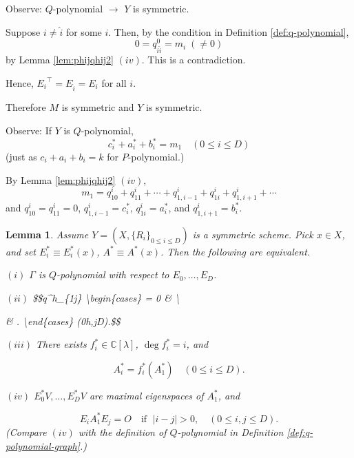 \documentclass[
]{book}
\newtheorem{lemma}{Lemma}[chapter]
\theoremstyle{definition}
\theoremstyle{definition}
\theoremstyle{definition}
\theoremstyle{definition}
\theoremstyle{remark}
\begin{document}
Observe: \(Q\)-polynomial \(\to\) \(Y\) is symmetric.

Suppose \(i\neq \hat{i}\) for some \(i\). Then, by the condition in Definition \ref{def:q-polynomial},
\[0 = q^0_{i\hat{i}} = m_i \; (\neq 0)\]
by Lemma \ref{lem:phijqhij2} \((iv)\).
This is a contradiction.

Hence, \({E_i}^\top = E_{\hat{i}} = E_i\) for all \(i\).

Therefore \(M\) is symmetric and \(Y\) is symmetric.

Observe: If \(Y\) is \(Q\)-polynomial,
\[c^*_i + a^*_i + b^*_i = m_1 \quad (0\leq i\leq D)\]
(just as \(c_i + a_i + b_i = k\) for \(P\)-polynomial.)

By Lemma \ref{lem:phijqhij2} \((iv)\),
\[m_1 = q^i_{10} + q^i_{11} + \cdots + q^i_{1,i-1} + q^i_{1i} + q^i_{1,i+1} + \cdots \]
and \(q^i_{10} = q^i_{11} = 0\), \(q^i_{1,i-1} = c^*_i\), \(q^i_{1i} = a^*_i\), and \(q^i_{1,i+1} = b^*_i\).

\begin{lemma}
\protect\hypertarget{lem:q-conditions}{}\label{lem:q-conditions}Assume \(Y = (X, \{R_i\}_{0\leq i\leq D})\) is a symmetric scheme. Pick \(x\in X\), and set \(E^*_i\equiv E^*_i(x)\), \(A^*\equiv A^*(x)\). Then the following are equivalent.

\((i)\) \(\Gamma\) is \(Q\)-polynomial with respect to \(E_0, \ldots, E_D\).

\((ii)\) \$\$q\^{}h\_\{1j\} \textbackslash begin\{cases\} = 0 \&  \textbackslash{}

 \& . \textbackslash end\{cases\} \quad (0\leq h,j\leq D).\$\$

\((iii)\) There exists \(f_i^*\in \mathbb{C}[\lambda]\), \(\deg f^*_i = i\), and

\[A^*_i = f^*_i(A^*_1) \quad (0\leq i\leq D).\]

\((iv)\) \(E^*_0V, \ldots, E^*_DV\) are maximal eigenspaces of \(A^*_1\), and

\[E_iA^*_1E_j = O \quad \text{if }\; |i-j|>0, \quad (0\leq i,j\leq D).\]
(Compare \((iv)\) with the definition of \(Q\)-polynomial in Definition \ref{def:q-polynomial-graph}.)
\end{lemma}
\end{document}
